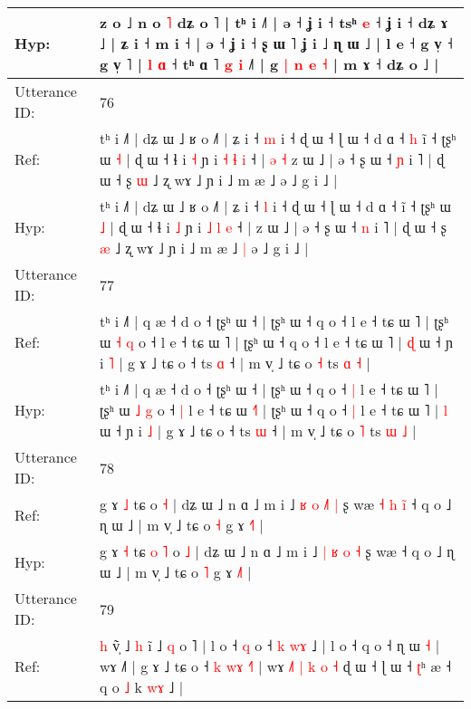 \documentclass[10pt]{article}
\DeclareRobustCommand{\hl}[1]{{\textcolor{red}{#1}}}
\begin{document}
\begin{longtable}{ll}
 \\
Hyp: & z o ˩ n o \hl{˥} dʑ o ˥ | tʰ i ˩˥ | ə ˧ ʝ i ˧ tsʰ \hl{e} ˧ ʝ i ˧\hl{}\hl{} dʑ ɤ ˩\hl{} | ʑ i ˧ m i ˧ | ə ˧ ʝ i ˧ ʂ ɯ ˥ ʝ i ˩ ɳ ɯ ˩ | l e ˧ g v̩ ˧ g v̩ ˥ | \hl{l} \hl{ɑ} ˧ tʰ ɑ \hl{}˥\hl{}\hl{} \hl{}\hl{g} \hl{i} ˩˥ | g\hl{}\hl{}\hl{} \hl{|} \hl{n} \hl{}\hl{e} \hl{}\hl{˧} | m ɤ ˧ dʑ o ˩ |
 \\
\midrule
Utterance ID: & 76 \\
Ref: & tʰ i ˩˥ | dʑ ɯ ˩ ʁ o ˩˥ | ʑ i ˧ \hl{m} i ˧ ɖ ɯ ˧ ɭ ɯ ˧ d ɑ ˧\hl{ }\hl{h} ĩ ˧ ʈʂʰ ɯ \hl{˧} | ɖ ɯ ˧ ɬ i \hl{˧} ɲ i \hl{˧} \hl{ɬ} \hl{i} ˧ |\hl{ }\hl{ə}\hl{ }\hl{˧} z ɯ ˩ | ə ˧ ʂ ɯ ˧ \hl{ɲ} i ˥ | ɖ ɯ ˧ ʂ \hl{ɯ} ˩ ʐ wɤ ˩ ɲ i ˩ m æ ˩\hl{}\hl{} ə ˩ g i ˩ |
 \\
Hyp: & tʰ i ˩˥ | dʑ ɯ ˩ ʁ o ˩˥ | ʑ i ˧ \hl{l} i ˧ ɖ ɯ ˧ ɭ ɯ ˧ d ɑ ˧\hl{}\hl{} ĩ ˧ ʈʂʰ ɯ \hl{˩} | ɖ ɯ ˧ ɬ i \hl{˩} ɲ i \hl{˩} \hl{l} \hl{e} ˧ |\hl{}\hl{}\hl{}\hl{} z ɯ ˩ | ə ˧ ʂ ɯ ˧ \hl{n} i ˥ | ɖ ɯ ˧ ʂ \hl{æ} ˩ ʐ wɤ ˩ ɲ i ˩ m æ ˩\hl{ }\hl{|} ə ˩ g i ˩ |
 \\
\midrule
Utterance ID: & 77 \\
Ref: & tʰ i ˩˥ | q æ ˧ d o ˧ ʈʂʰ ɯ ˧ | ʈʂʰ ɯ ˧ q o ˧\hl{}\hl{} l e ˧ tɕ ɯ ˥ | ʈʂʰ ɯ \hl{˧} \hl{q} o ˧\hl{}\hl{} l e ˧ tɕ ɯ \hl{}˥ | ʈʂʰ ɯ ˧ q o ˧\hl{}\hl{} l e ˧ tɕ ɯ ˥ | \hl{ɖ} ɯ ˧ ɲ i \hl{˥} | g ɤ ˩ tɕ o ˧ ts \hl{ɑ} ˧ | m v̩ ˩ tɕ o \hl{˧} ts \hl{ɑ} \hl{˧} |
 \\
Hyp: & tʰ i ˩˥ | q æ ˧ d o ˧ ʈʂʰ ɯ ˧ | ʈʂʰ ɯ ˧ q o ˧\hl{ }\hl{|} l e ˧ tɕ ɯ ˥ | ʈʂʰ ɯ \hl{˩} \hl{g} o ˧\hl{ }\hl{|} l e ˧ tɕ ɯ \hl{˧}˥ | ʈʂʰ ɯ ˧ q o ˧\hl{ }\hl{|} l e ˧ tɕ ɯ ˥ | \hl{l} ɯ ˧ ɲ i \hl{˩} | g ɤ ˩ tɕ o ˧ ts \hl{ɯ} ˧ | m v̩ ˩ tɕ o \hl{˥} ts \hl{ɯ} \hl{˩} |
 \\
\midrule
Utterance ID: & 78 \\
Ref: & g ɤ \hl{˩} tɕ\hl{}\hl{}\hl{}\hl{} o \hl{˧} | dʑ ɯ ˩ n ɑ ˩ m i ˩ \hl{ʁ} \hl{o} \hl{˩}\hl{˥} \hl{|} ʂ wæ\hl{ }\hl{˧}\hl{ }\hl{h}\hl{ }\hl{i}\hl{̃} ˧ q o ˩ ɳ ɯ ˩ | m v̩ ˩ tɕ o \hl{˧} g ɤ \hl{˧}˥ |
 \\
Hyp: & g ɤ \hl{˧} tɕ\hl{ }\hl{o}\hl{ }\hl{˥} o \hl{˩} | dʑ ɯ ˩ n ɑ ˩ m i ˩ \hl{|} \hl{ʁ} \hl{}\hl{o} \hl{˧} ʂ wæ\hl{}\hl{}\hl{}\hl{}\hl{}\hl{}\hl{} ˧ q o ˩ ɳ ɯ ˩ | m v̩ ˩ tɕ o \hl{˥} g ɤ \hl{˩}˥ |
 \\
\midrule
Utterance ID: & 79 \\
Ref: & \hl{}\hl{h} v\hl{̃}̩ ˩ \hl{h} i\hl{̃} ˩ \hl{q} o ˥ | l o ˧ \hl{q} o ˧ \hl{k} \hl{w}\hl{ɤ} ˩ | l o ˧ q o ˧ ɳ ɯ \hl{˧} | wɤ ˩˥ | g ɤ ˩ tɕ o ˧ \hl{k} \hl{w}\hl{ɤ} \hl{˧}˥ |\hl{}\hl{} wɤ \hl{˩}\hl{˥} \hl{|} \hl{k} \hl{o} \hl{˧} ɖ ɯ ˧ ɭ ɯ ˧ \hl{ʈ}ʰ æ ˧ q o \hl{˩} k \hl{w}\hl{ɤ} ˩ |

\end{longtable}
\end{document}
